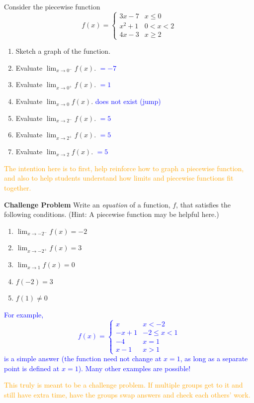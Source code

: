 \documentclass{ximera}
\begin{document}
\begin{exercise}   
  Consider the piecewise function 
  \[f(x)=
  \begin{cases}
    3x-7 & x\leq 0\\
    x^2+1 & 0<x<2\\
    4x-3 & x\geq 2
  \end{cases}\]
  \begin{enumerate}
    \item Sketch a graph of the function.
    \item Evaluate $\lim_{x\rightarrow 0^-}f(x)$.
    \textcolor{blue}{$=-7$}
    \item Evaluate $\lim_{x\rightarrow 0^+}f(x)$.
    \textcolor{blue}{$=1$}
    \item Evaluate $\lim_{x\rightarrow 0}f(x)$.
    \textcolor{blue}{does not exist (jump)}
    \item Evaluate $\lim_{x\rightarrow 2^-}f(x)$.
    \textcolor{blue}{$=5$}
    \item Evaluate $\lim_{x\rightarrow 2^+}f(x)$.
    \textcolor{blue}{$=5$}
    \item Evaluate $\lim_{x\rightarrow 2}f(x)$.
    \textcolor{blue}{$=5$}
  \end{enumerate}
  \textcolor{orange}{The intention here is to first, help reinforce how to graph a piecewise function, and also to help students understand how limits and piecewise functions fit together.}
\end{exercise}

\begin{exercise}
    \textbf{Challenge Problem} Write an \textit{equation} of a function, $f$, that satisfies the following conditions.  (Hint: A piecewise function may be helpful here.)
    \begin{enumerate}
        \item $\displaystyle\lim_{x\rightarrow -2^-}f(x)=-2$
        \item $\displaystyle \lim_{x\rightarrow -2^+}f(x)=3$
        \item $\displaystyle \lim_{x\rightarrow 1}f(x)=0$
        \item $f(-2)=3$
        \item $f(1)\neq 0$
    \end{enumerate}

    \textcolor{blue}{For example, \[f(x)=\begin{cases}
    x & x<-2\\
    -x+1 & -2\leq x<1\\
    -4 & x=1\\
    x-1 & x>1
    \end{cases}\]}
    \textcolor{blue}{is a simple answer (the function need not change at $x=1$, as long as a separate point is defined at $x=1$).  Many other examples are possible!}

    \textcolor{orange}{This truly is meant to be a challenge problem.  If multiple groups get to it and still have extra time, have the groups swap answers and check each others' work.}
\end{exercise}
\end{document}
